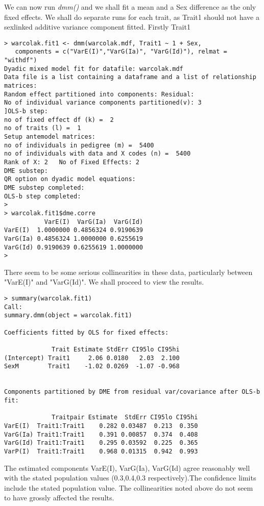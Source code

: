 \documentclass[titlepage]{article}  %
\begin{document}
We can now run {\em dmm()} and we shall fit a mean and a Sex difference as the only fixed effects. We shall do separate runs for each trait, as Trait1 should not have a sexlinked additive variance component fitted. Firstly Trait1 

\begin{verbatim}
> warcolak.fit1 <- dmm(warcolak.mdf, Trait1 ~ 1 + Sex,
   components = c("VarE(I)","VarG(Ia)", "VarG(Id)"), relmat = "withdf")
Dyadic mixed model fit for datafile: warcolak.mdf  
Data file is a list containing a dataframe and a list of relationship matrices:
Random effect partitioned into components: Residual:
No of individual variance components partitioned(v): 3 
]OLS-b step:
no of fixed effect df (k) =  2 
no of traits (l) =  1 
Setup antemodel matrices:
no of individuals in pedigree (m) =  5400 
no of individuals with data and X codes (n) =  5400 
Rank of X: 2   No of Fixed Effects: 2 
DME substep:
QR option on dyadic model equations:
DME substep completed:
OLS-b step completed:
> 
> warcolak.fit1$dme.corre
           VarE(I)  VarG(Ia)  VarG(Id)
VarE(I)  1.0000000 0.4856324 0.9190639
VarG(Ia) 0.4856324 1.0000000 0.6255619
VarG(Id) 0.9190639 0.6255619 1.0000000
> 
\end{verbatim}

There seem to be some serious collinearities in these data, particularly between "VarE(I)" and "VarG(Id)". We shall proceed to view the results.


\begin{verbatim}
> summary(warcolak.fit1)
Call:
summary.dmm(object = warcolak.fit1)

Coefficients fitted by OLS for fixed effects:

             Trait Estimate StdErr CI95lo CI95hi
(Intercept) Trait1     2.06 0.0180   2.03  2.100
SexM        Trait1    -1.02 0.0269  -1.07 -0.968


Components partitioned by DME from residual var/covariance after OLS-b fit:

             Traitpair Estimate  StdErr CI95lo CI95hi
VarE(I)  Trait1:Trait1    0.282 0.03487  0.213  0.350
VarG(Ia) Trait1:Trait1    0.391 0.00857  0.374  0.408
VarG(Id) Trait1:Trait1    0.295 0.03592  0.225  0.365
VarP(I)  Trait1:Trait1    0.968 0.01315  0.942  0.993
\end{verbatim}

 The estimated components VarE(I), VarG(Ia), VarG(Id) agree reasonably well with the stated population values (0.3,0.4,0.3 respectively).The confidence limits include the stated population value.  The collinearities noted above do not seem to have grossly affected the results.
\end{document}

